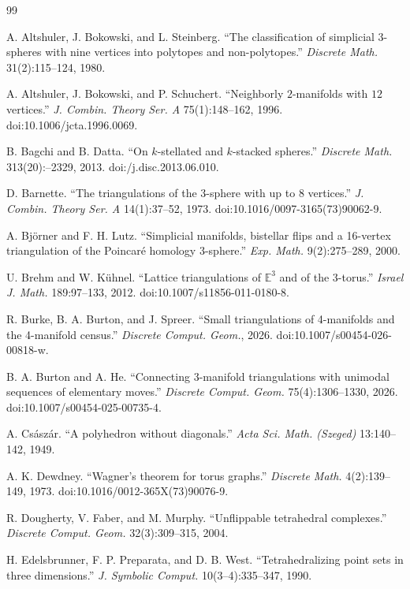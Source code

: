 \documentclass[11pt]{article}
\theoremstyle{remark}
\theoremstyle{plain}
\begin{document}
\begin{thebibliography}{99}
\small

A. Altshuler, J. Bokowski, and L. Steinberg.
``The classification of simplicial 3-spheres with nine vertices into
polytopes and non-polytopes.''
\emph{Discrete Math.} 31(2):115--124, 1980.

A. Altshuler, J. Bokowski, and P. Schuchert.
``Neighborly \(2\)-manifolds with \(12\) vertices.''
\emph{J. Combin. Theory Ser. A} 75(1):148--162, 1996.
doi:10.1006/jcta.1996.0069.

B. Bagchi and B. Datta.
``On \(k\)-stellated and \(k\)-stacked spheres.''
\emph{Discrete Math.} 313(20):--2329, 2013.
doi:/j.disc.2013.06.010.

D. Barnette.
``The triangulations of the 3-sphere with up to 8 vertices.''
\emph{J. Combin. Theory Ser. A} 14(1):37--52, 1973.
doi:10.1016/0097-3165(73)90062-9.

A. Bj\"orner and F. H. Lutz.
``Simplicial manifolds, bistellar flips and a 16-vertex triangulation of the
Poincar\'e homology 3-sphere.''
\emph{Exp. Math.} 9(2):275--289, 2000.

U. Brehm and W. K\"uhnel.
``Lattice triangulations of \(\mathbb E^3\) and of the 3-torus.''
\emph{Israel J. Math.} 189:97--133, 2012.
doi:10.1007/s11856-011-0180-8.

R. Burke, B. A. Burton, and J. Spreer.
``Small triangulations of 4-manifolds and the 4-manifold census.''
\emph{Discrete Comput. Geom.}, 2026.
doi:10.1007/s00454-026-00818-w.

B. A. Burton and A. He.
``Connecting 3-manifold triangulations with unimodal sequences of elementary
moves.''
\emph{Discrete Comput. Geom.} 75(4):1306--1330, 2026.
doi:10.1007/s00454-025-00735-4.

A. Cs\'asz\'ar.
``A polyhedron without diagonals.''
\emph{Acta Sci. Math. (Szeged)} 13:140--142, 1949.

A. K. Dewdney.
``Wagner's theorem for torus graphs.''
\emph{Discrete Math.} 4(2):139--149, 1973.
doi:10.1016/0012-365X(73)90076-9.

R. Dougherty, V. Faber, and M. Murphy.
``Unflippable tetrahedral complexes.''
\emph{Discrete Comput. Geom.} 32(3):309--315, 2004.

H. Edelsbrunner, F. P. Preparata, and D. B. West.
``Tetrahedralizing point sets in three dimensions.''
\emph{J. Symbolic Comput.} 10(3--4):335--347, 1990.


\end{thebibliography}
\end{document}
